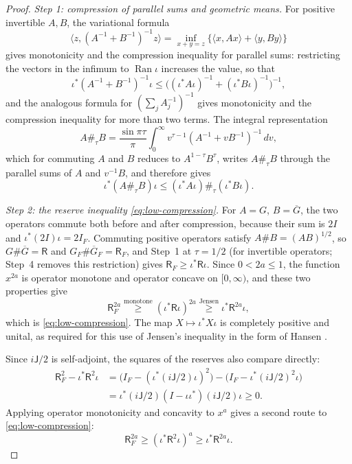 \documentclass[11pt]{amsart}
\numberwithin{equation}{section}
\theoremstyle{definition}
\newcommand{\Res}{\mathsf R}
\newcommand{\Ran}{\operatorname{Ran}}
\newcommand{\ip}[2]{\langle #1,#2\rangle}
\begin{document}
\begin{proof}
\emph{Step 1: compression of parallel sums and geometric means.} For
positive invertible \(A,B\), the variational formula
\[
 \ip{z}{(A^{-1}+B^{-1})^{-1}z}
 =\inf_{x+y=z}\{\ip{x}{Ax}+\ip{y}{By}\}
\]
gives monotonicity and the compression inequality for parallel sums:
restricting the vectors in the infimum to \(\Ran\iota\) increases
the value, so that
\[
 \iota^*(A^{-1}+B^{-1})^{-1}\iota
 \le\bigl((\iota^*A\iota)^{-1}+(\iota^*B\iota)^{-1}\bigr)^{-1},
\]
and the analogous formula for \((\sum_jA_j^{-1})^{-1}\) gives monotonicity
and the compression inequality for more than two terms. The integral representation
\[
 A\#_\tau B
 =\frac{\sin\pi\tau}{\pi}
   \int_0^\infty v^{\tau-1}(A^{-1}+vB^{-1})^{-1}\,dv,
\]
which for commuting \(A\) and \(B\) reduces to \(A^{1-\tau}B^\tau\),
writes \(A\#_\tau B\) through the parallel sums of \(A\) and
\(v^{-1}B\), and therefore gives
\[
 \iota^*(A\#_\tau B)\iota
 \le(\iota^*A\iota)\#_\tau(\iota^*B\iota).
\]

\smallskip
\emph{Step 2: the reserve inequality \eqref{eq:low-compression}.} For
\(A=G\), \(B=\overline G\), the two operators commute both before
and after compression, because their sum is \(2I\) and
\(\iota^*(2I)\iota=2I_F\). Commuting positive operators satisfy
\(A\#B=(AB)^{1/2}\), so \(G\#\overline G=\Res\) and
\(G_F\#\overline G_F=\Res_F\), and Step~1 at \(\tau=1/2\) (for invertible
operators; Step~4 removes this restriction) gives
\(\Res_F\ge\iota^*\Res\iota\). Since \(0<2a\le1\), the function
\(x^{2a}\) is operator monotone and operator concave on \([0,\infty)\),
and these two properties give
\[
 \Res_F^{2a}
 \overset{\text{monotone}}{\ge}(\iota^*\Res\iota)^{2a}
 \overset{\text{Jensen}}{\ge}\iota^*\Res^{2a}\iota,
\]
which is \eqref{eq:low-compression}. The map \(X\mapsto\iota^*X\iota\) is
completely positive and unital, as required for this use of Jensen's
inequality in the form of Hansen \cite[Corollary]{Hansen80}.

Since \(i\mathsf J/2\) is self-adjoint, the squares of the reserves
also compare directly:
\begin{align*}
 \Res_F^2-\iota^*\Res^2\iota
 &=\bigl(I_F-(\iota^*(i\mathsf J/2)\iota)^2\bigr)
  -\bigl(I_F-\iota^*(i\mathsf J/2)^2\iota\bigr)\\
 &=\iota^*(i\mathsf J/2)(I-\iota\iota^*)(i\mathsf J/2)\iota\ge0.
\end{align*}
Applying operator monotonicity and concavity to \(x^a\) gives a
second route to \eqref{eq:low-compression}:
\[
 \Res_F^{2a}\ge(\iota^*\Res^2\iota)^a\ge\iota^*\Res^{2a}\iota.
\]


\end{proof}
\end{document}

